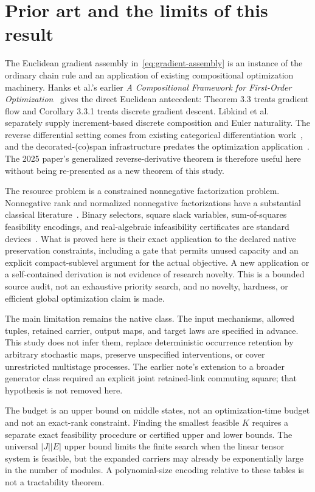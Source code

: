 \documentclass[11pt]{article}
\theoremstyle{remark}
\begin{document}
\section{Prior art and the limits of this result}\label{sec:prior}

The Euclidean gradient assembly in~\eqref{eq:gradient-assembly} is an instance of the ordinary chain rule and an application of existing compositional optimization machinery. Hanks et al.'s earlier \emph{A Compositional Framework for First-Order Optimization}~\cite{Hanks2024} gives the direct Euclidean antecedent: Theorem 3.3 treats gradient flow and Corollary 3.3.1 treats discrete gradient descent. Libkind et al.~\cite{Libkind2022} separately supply increment-based discrete composition and Euler naturality. The reverse differential setting comes from existing categorical differentiation work~\cite{Cockett2020}, and the decorated-(co)span infrastructure predates the optimization application~\cite{Fong2015}. The 2025 paper's generalized reverse-derivative theorem is therefore useful here without being re-presented as a new theorem of this study.

The resource problem is a constrained nonnegative factorization problem. Nonnegative rank and normalized nonnegative factorizations have a substantial classical literature~\cite{CohenRothblum1993}. Binary selectors, square slack variables, sum-of-squares feasibility encodings, and real-algebraic infeasibility certificates are standard devices~\cite{Parrilo2003,Basu2014}. What is proved here is their exact application to the declared native preservation constraints, including a gate that permits unused capacity and an explicit compact-sublevel argument for the actual objective. A new application or a self-contained derivation is not evidence of research novelty. This is a bounded source audit, not an exhaustive priority search, and no novelty, hardness, or efficient global optimization claim is made.

The main limitation remains the native class. The input mechanisms, allowed tuples, retained carrier, output maps, and target laws are specified in advance. This study does not infer them, replace deterministic occurrence retention by arbitrary stochastic maps, preserve unspecified interventions, or cover unrestricted multistage processes. The earlier note's extension to a broader generator class required an explicit joint retained-link commuting square; that hypothesis is not removed here.

The budget is an upper bound on middle states, not an optimization-time budget and not an exact-rank constraint. Finding the smallest feasible $K$ requires a separate exact feasibility procedure or certified upper and lower bounds. The universal $|J||E|$ upper bound limits the finite search when the linear tensor system is feasible, but the expanded carriers may already be exponentially large in the number of modules. A polynomial-size encoding relative to these tables is not a tractability theorem.
\end{document}
